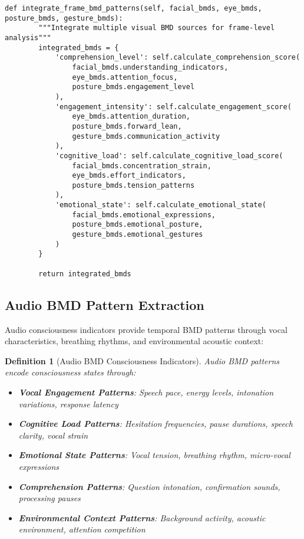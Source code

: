 \documentclass[12pt,a4paper]{article}
\newtheorem{definition}[theorem]{Definition}
\begin{document}
\begin{lstlisting}[style=pythonstyle, caption=Visual BMD Pattern Recognition]
    def integrate_frame_bmd_patterns(self, facial_bmds, eye_bmds, posture_bmds, gesture_bmds):
        """Integrate multiple visual BMD sources for frame-level analysis"""
        integrated_bmds = {
            'comprehension_level': self.calculate_comprehension_score(
                facial_bmds.understanding_indicators,
                eye_bmds.attention_focus,
                posture_bmds.engagement_level
            ),
            'engagement_intensity': self.calculate_engagement_score(
                eye_bmds.attention_duration,
                posture_bmds.forward_lean,
                gesture_bmds.communication_activity
            ),
            'cognitive_load': self.calculate_cognitive_load_score(
                facial_bmds.concentration_strain,
                eye_bmds.effort_indicators,
                posture_bmds.tension_patterns
            ),
            'emotional_state': self.calculate_emotional_state(
                facial_bmds.emotional_expressions,
                posture_bmds.emotional_posture,
                gesture_bmds.emotional_gestures
            )
        }
        
        return integrated_bmds
\end{lstlisting}

\subsection{Audio BMD Pattern Extraction}

Audio consciousness indicators provide temporal BMD patterns through vocal characteristics, breathing rhythms, and environmental acoustic context:

\begin{definition}[Audio BMD Consciousness Indicators]
Audio BMD patterns encode consciousness states through:
\begin{itemize}
\item \textbf{Vocal Engagement Patterns}: Speech pace, energy levels, intonation variations, response latency
\item \textbf{Cognitive Load Patterns}: Hesitation frequencies, pause durations, speech clarity, vocal strain
\item \textbf{Emotional State Patterns}: Vocal tension, breathing rhythm, micro-vocal expressions
\item \textbf{Comprehension Patterns}: Question intonation, confirmation sounds, processing pauses
\item \textbf{Environmental Context Patterns}: Background activity, acoustic environment, attention competition
\end{itemize}
\end{definition}
\end{document}
